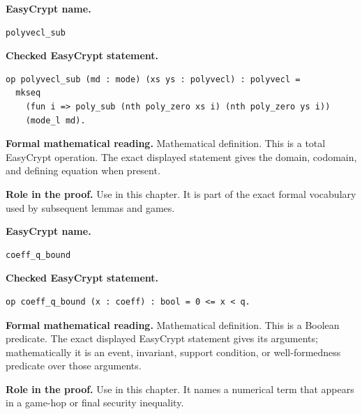 \begin{formaldefinition}
\noindent\textbf{EasyCrypt name.}
\begin{lstlisting}[language=EasyCrypt,basicstyle=\ttfamily\scriptsize]
polyvecl_sub
\end{lstlisting}
\noindent\textbf{Checked EasyCrypt statement.}
\begin{lstlisting}[language=EasyCrypt,basicstyle=\ttfamily\scriptsize]
op polyvecl_sub (md : mode) (xs ys : polyvecl) : polyvecl =
  mkseq
    (fun i => poly_sub (nth poly_zero xs i) (nth poly_zero ys i))
    (mode_l md).
\end{lstlisting}
\noindent\textbf{Formal mathematical reading.}
Mathematical definition. This is a total EasyCrypt operation.  The exact displayed statement gives the domain, codomain, and defining equation when present.

\noindent\textbf{Role in the proof.}
Use in this chapter. It is part of the exact formal vocabulary used by subsequent lemmas and games.

\end{formaldefinition}

\begin{formaldefinition}
\noindent\textbf{EasyCrypt name.}
\begin{lstlisting}[language=EasyCrypt,basicstyle=\ttfamily\scriptsize]
coeff_q_bound
\end{lstlisting}
\noindent\textbf{Checked EasyCrypt statement.}
\begin{lstlisting}[language=EasyCrypt,basicstyle=\ttfamily\scriptsize]
op coeff_q_bound (x : coeff) : bool = 0 <= x < q.
\end{lstlisting}
\noindent\textbf{Formal mathematical reading.}
Mathematical definition. This is a Boolean predicate.  The exact displayed EasyCrypt statement gives its arguments; mathematically it is an event, invariant, support condition, or well-formedness predicate over those arguments.

\noindent\textbf{Role in the proof.}
Use in this chapter. It names a numerical term that appears in a game-hop or final security inequality.

\end{formaldefinition}

